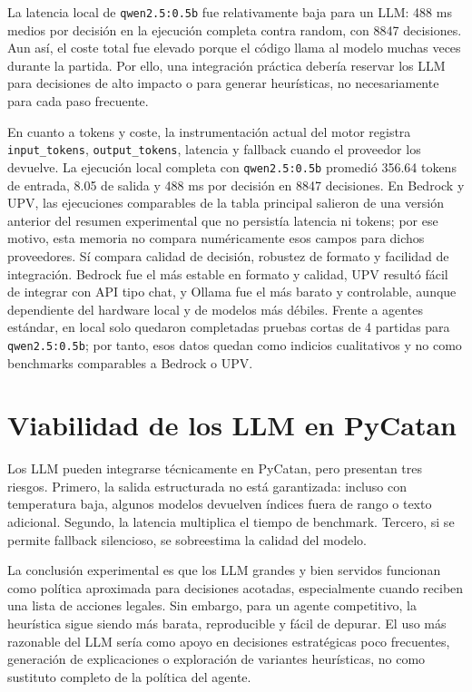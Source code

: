 ﻿\documentclass[10pt,a4paper]{article}
\begin{document}
La latencia local de \texttt{qwen2.5:0.5b} fue relativamente baja para un LLM: 488 ms medios por decisión en la ejecución completa contra random, con 8847 decisiones. Aun así, el coste total fue elevado porque el código llama al modelo muchas veces durante la partida. Por ello, una integración práctica debería reservar los LLM para decisiones de alto impacto o para generar heurísticas, no necesariamente para cada paso frecuente.

En cuanto a tokens y coste, la instrumentación actual del motor registra \texttt{input\_tokens}, \texttt{output\_tokens}, latencia y fallback cuando el proveedor los devuelve. La ejecución local completa con \texttt{qwen2.5:0.5b} promedió 356.64 tokens de entrada, 8.05 de salida y 488 ms por decisión en 8847 decisiones. En Bedrock y UPV, las ejecuciones comparables de la tabla principal salieron de una versión anterior del resumen experimental que no persistía latencia ni tokens; por ese motivo, esta memoria no compara numéricamente esos campos para dichos proveedores. Sí compara calidad de decisión, robustez de formato y facilidad de integración. Bedrock fue el más estable en formato y calidad, UPV resultó fácil de integrar con API tipo chat, y Ollama fue el más barato y controlable, aunque dependiente del hardware local y de modelos más débiles. Frente a agentes estándar, en local solo quedaron completadas pruebas cortas de 4 partidas para \texttt{qwen2.5:0.5b}; por tanto, esos datos quedan como indicios cualitativos y no como benchmarks comparables a Bedrock o UPV.

\section{Viabilidad de los LLM en PyCatan}
Los LLM pueden integrarse técnicamente en PyCatan, pero presentan tres riesgos. Primero, la salida estructurada no está garantizada: incluso con temperatura baja, algunos modelos devuelven índices fuera de rango o texto adicional. Segundo, la latencia multiplica el tiempo de benchmark. Tercero, si se permite fallback silencioso, se sobreestima la calidad del modelo.

La conclusión experimental es que los LLM grandes y bien servidos funcionan como política aproximada para decisiones acotadas, especialmente cuando reciben una lista de acciones legales. Sin embargo, para un agente competitivo, la heurística sigue siendo más barata, reproducible y fácil de depurar. El uso más razonable del LLM sería como apoyo en decisiones estratégicas poco frecuentes, generación de explicaciones o exploración de variantes heurísticas, no como sustituto completo de la política del agente.
\end{document}
